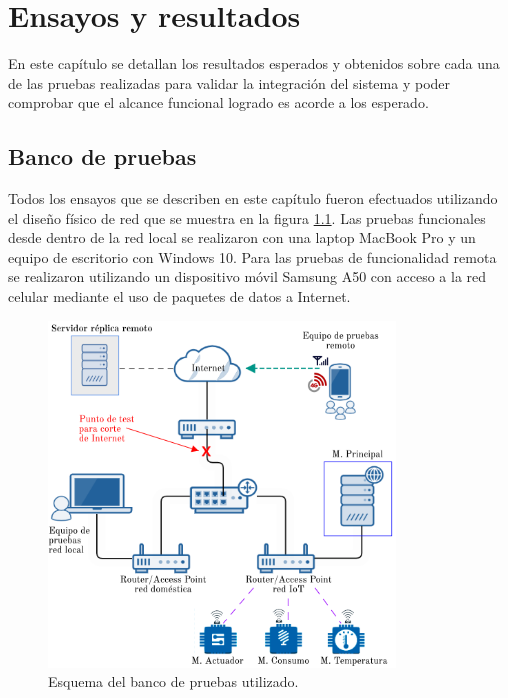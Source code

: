 
\chapter{Ensayos y resultados} %

\label{Chapter4} %


En este capítulo se detallan los resultados esperados y obtenidos sobre cada una de las pruebas realizadas para validar la integración del sistema y poder comprobar que el alcance funcional logrado es acorde a los esperado.


\section{Banco de pruebas}

Todos los ensayos que se describen en este capítulo fueron efectuados utilizando el diseño físico de red que se muestra en la figura \ref{fig:banco}. Las pruebas funcionales desde dentro de la red local se realizaron con una laptop MacBook Pro y un equipo de escritorio con Windows 10. Para las pruebas de funcionalidad remota se realizaron utilizando un dispositivo móvil Samsung A50 con acceso a la red celular mediante el uso de paquetes de datos a Internet.

\begin{figure}[htbp]
	\centering
	\includegraphics[width=0.82\textwidth]{./Figures/banco2.png}
	\caption{Esquema del banco de pruebas utilizado.}

	\label{fig:banco}
\end{figure}


